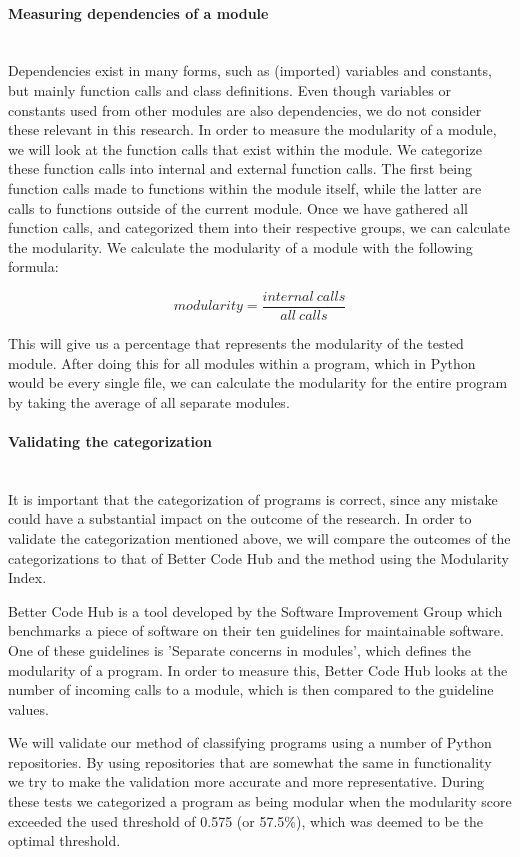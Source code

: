 \documentclass[twoside]{uva-inf-bachelor-thesis}
\newcommand{\myparagraph}[1]{\paragraph{#1}\mbox{}\\}
\begin{document}
\myparagraph{Measuring dependencies of a module}
Dependencies exist in many forms, such as (imported) variables and constants, but mainly function calls and class definitions. Even though variables or constants used from other modules are also dependencies, we do not consider these relevant in this research. In order to measure the modularity of a module, we will look at the function calls that exist within the module. We categorize these function calls into internal and external function calls. The first being function calls made to functions within the module itself, while the latter are calls to functions outside of the current module. Once we have gathered all function calls, and categorized them into their respective groups, we can calculate the modularity. We calculate the modularity of a module with the following formula:

\[ modularity = \dfrac{internal\ calls}{all\ calls} \]

This will give us a percentage that represents the modularity of the tested module. After doing this for all modules within a program, which in Python would be every single file, we can calculate the modularity for the entire program by taking the average of all separate modules.

\myparagraph{Validating the categorization}
It is important that the categorization of programs is correct, since any mistake could have a substantial impact on the outcome of the research. In order to validate the categorization mentioned above, we will compare the outcomes of the categorizations to that of Better Code Hub\cite{BetterCodeHub} and the method using the Modularity Index\cite{emanuel2013modularity}.

Better Code Hub is a tool developed by the Software Improvement Group\cite{SIG} which benchmarks a piece of software on their ten guidelines for maintainable software. One of these guidelines is 'Separate concerns in modules', which defines the modularity of a program. In order to measure this, Better Code Hub looks at the number of incoming calls to a module, which is then compared to the guideline values.

We will validate our method of classifying programs using a number of Python repositories. By using repositories that are somewhat the same in functionality we try to make the validation more accurate and more representative. During these tests we categorized a program as being modular when the modularity score exceeded the used threshold of 0.575 (or 57.5\%), which was deemed to be the optimal threshold.
\end{document}
